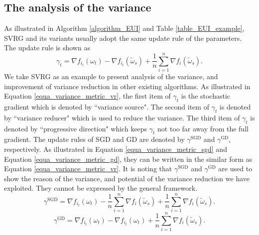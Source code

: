 \documentclass[letterpaper]{article}
\begin{document}
\subsection{The analysis of the variance}
\label{subsect_variance_analysis}
As illustrated  in Algorithm \ref{algorithm_EUI} and Table \ref{table_EUI_example},  SVRG and its variants  usually adopt the same update rule of the parameters. The update rule is shown as
\begin{equation}
\label{equa_variance_metric_vr}
\gamma_t=\nabla f_{i_t}(\omega_{t})-\nabla f_{i_t}(\tilde{\omega}_s)+\frac{1}{n}\sum\limits_{i=1}^n\nabla f_i(\tilde{\omega}_s).
\end{equation} 
We take SVRG  as an example to present analysis of the variance, and  improvement of variance reduction in other existing algorithms. As illustrated in Equation \ref{equa_variance_metric_vr}, the first item of $\gamma_t$ is the stochastic gradient which is denoted by  ``variance source". The second item of $\gamma_t$ is denoted by  ``variance reducer" which is used to reduce the variance. The third item of $\gamma_t$ is denoted by ``progressive direction" which keeps $\gamma_t$ not too far away from the full gradient.  The update rules of SGD and GD are denoted by $\gamma^{\text{SGD}}$ and $\gamma^{\text{GD}}$, respectively. As illustrated in Equation \ref{equa_variance_metric_sgd} and Equation \ref{equa_variance_metric_gd}, they can be written in the similar form as Equation \ref{equa_variance_metric_vr}. It is noting that $\gamma^{\text{SGD}}$ and $\gamma^{\text{GD}}$ are used to show the reason of the variance, and potential of the variance reduction we have exploited. They cannot be expressed by the general framework.  
\begin{equation}
\label{equa_variance_metric_sgd}
 \gamma^{\text{SGD}}=\nabla f_{i_t}(\omega_{t})-\frac{1}{n}\sum\limits_{i=1}^n\nabla f_i(\tilde{\omega}_s)+\frac{1}{n}\sum\limits_{i=1}^n\nabla f_i(\tilde{\omega}_s).
\end{equation}
\begin{equation}
\label{equa_variance_metric_gd}
\gamma^{\text{GD}}=\nabla f_{i_t}(\omega_{t})-\nabla f_{i_t}(\omega_{t})+\frac{1}{n}\sum\limits_{i=1}^n\nabla f_i(\tilde{\omega}_s).
\end{equation}
\end{document}
